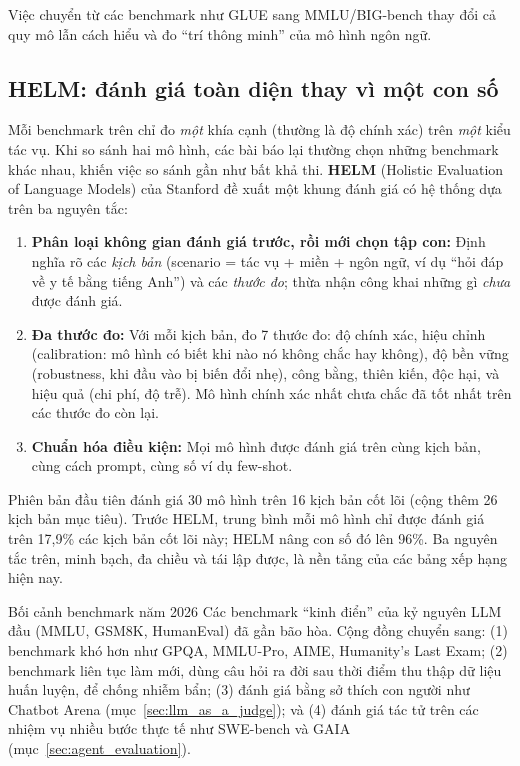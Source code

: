 Việc chuyển từ các benchmark như GLUE sang MMLU/BIG-bench thay đổi cả quy mô lẫn cách hiểu và đo “trí thông minh” của mô hình ngôn ngữ.

\subsection{HELM: đánh giá toàn diện thay vì một con số}
\label{ssec:helm}
Mỗi benchmark trên chỉ đo \emph{một} khía cạnh (thường là độ chính xác) trên \emph{một} kiểu tác vụ. Khi so sánh hai mô hình, các bài báo lại thường chọn những benchmark khác nhau, khiến việc so sánh gần như bất khả thi. \textbf{HELM} (Holistic Evaluation of Language Models) \cite{liang2022helm} của Stanford đề xuất một khung đánh giá có hệ thống dựa trên ba nguyên tắc:
\begin{enumerate}
	\item \textbf{Phân loại không gian đánh giá trước, rồi mới chọn tập con:} Định nghĩa rõ các \emph{kịch bản} (scenario = tác vụ + miền + ngôn ngữ, ví dụ “hỏi đáp về y tế bằng tiếng Anh”) và các \emph{thước đo}; thừa nhận công khai những gì \emph{chưa} được đánh giá.
	\item \textbf{Đa thước đo:} Với mỗi kịch bản, đo 7 thước đo: độ chính xác, hiệu chỉnh (calibration: mô hình có biết khi nào nó không chắc hay không), độ bền vững (robustness, khi đầu vào bị biến đổi nhẹ), công bằng, thiên kiến, độc hại, và hiệu quả (chi phí, độ trễ). Mô hình chính xác nhất chưa chắc đã tốt nhất trên các thước đo còn lại.
	\item \textbf{Chuẩn hóa điều kiện:} Mọi mô hình được đánh giá trên cùng kịch bản, cùng cách prompt, cùng số ví dụ few-shot.
\end{enumerate}
Phiên bản đầu tiên đánh giá 30 mô hình trên 16 kịch bản cốt lõi (cộng thêm 26 kịch bản mục tiêu). Trước HELM, trung bình mỗi mô hình chỉ được đánh giá trên 17{,}9\% các kịch bản cốt lõi này; HELM nâng con số đó lên 96\%. Ba nguyên tắc trên, minh bạch, đa chiều và tái lập được, là nền tảng của các bảng xếp hạng hiện nay.

\begin{keyidea}{Bối cảnh benchmark năm 2026}
Các benchmark “kinh điển” của kỷ nguyên LLM đầu (MMLU, GSM8K, HumanEval) đã gần bão hòa. Cộng đồng chuyển sang: (1) benchmark khó hơn như GPQA, MMLU-Pro, AIME, Humanity's Last Exam; (2) benchmark liên tục làm mới, dùng câu hỏi ra đời sau thời điểm thu thập dữ liệu huấn luyện, để chống nhiễm bẩn; (3) đánh giá bằng sở thích con người như Chatbot Arena (mục~\ref{sec:llm_as_a_judge}); và (4) đánh giá tác tử trên các nhiệm vụ nhiều bước thực tế như SWE-bench và GAIA (mục~\ref{sec:agent_evaluation}).
\end{keyidea}